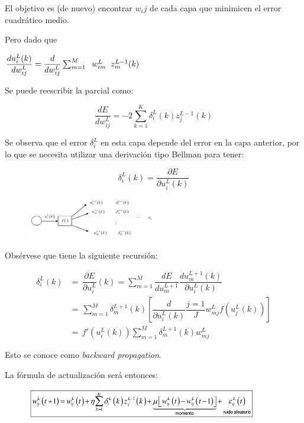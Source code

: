 El objetivo es (de nuevo) encontrar $w_ij$ de cada capa que minimicen el error cuadrático medio.


Pero dado que

$
\dfrac{du_i^L (k)}{dw_{ij}^L} = \dfrac{d}{dw_{ij}^L}  \sum_{m=1}^{M} \hspace{0.2cm} w_{im}^L \hspace{0.2cm} z_{m}^{L-1} (k) 
$


Se puede reescribir la parcial como:

$$\dfrac{dE}{dw_{ij}^L} = -2 \sum_{k=1}^{K}  \delta_{i}^L (k) z_{j}^{L-1}(k)$$
	
Se observa que el error $\delta_i^L$ en esta capa depende del error en la capa anterior, por lo que se necesita utilizar una derivación tipo Bellman para tener:

$$ \delta_{i}^L (k) = \dfrac{\partial E}{\partial u_{i}^L (k)} $$

\begin{figure}[h!]
	\centering
	\includegraphics[width=0.5\textwidth]{images/img79.png}
	\label{figura79}
\end{figure}

Obsérvese que tiene la siguiente recursión:


\begin{equation*}
	\begin{aligned}
		 \delta_i^L (k) & = \, \dfrac{\partial E}{\partial u_{i}^L }(k) = \sum_{m=1}^{M} \dfrac{dE}{du_m^{L+1}} \dfrac{du_m^{L+1} (k)}{\partial u_i^L (k)}  \\
		& = \,\sum_{m=1}^{M} \delta_m^{L+1} (k) \left[ \dfrac{d}{\partial u_i^L (k)} \dfrac{j=1}{J} w_{mj}^L f (u_j^L (k)) \right] \\
		& = \, f'(u_i^L(k)) \sum_{m=1}^{M} \delta_m^{L+1} (k) w_{mj}^L 
	\end{aligned}
\end{equation*}

Esto se conoce como \textit{backward propagation}.

La fórmula de actualización será entonces:
\begin{figure}[h!]
	\centering
	\includegraphics[width=0.9\textwidth]{images/img79_f.png}
	\label{figura79_f}
\end{figure}

